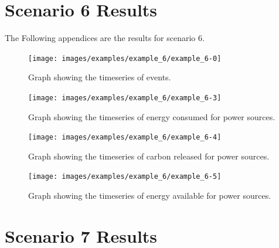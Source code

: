 \documentclass{l4proj}
\begin{document}
\begin{appendices}
\clearpage
\section{Scenario 6 Results}\label{apen:subsec:scen6}
The Following appendices are the results for scenario 6.
\clearpage
\begin{figure}[htbp]
    \centering
    \texttt{[image: images/examples/example\_6/example\_6-0]}
    ~
    \caption{Graph showing the timeseries of events.}
    \label{fig:example6-0}
\end{figure}
\clearpage
\begin{figure}[htbp]
    \centering
    \texttt{[image: images/examples/example\_6/example\_6-3]}
    ~
    \caption{Graph showing the timeseries of energy consumed for power sources.}
    \label{fig:example6-1}
\end{figure}
\clearpage
\begin{figure}[htbp]
    \centering
    \texttt{[image: images/examples/example\_6/example\_6-4]}
    ~
    \caption{Graph showing the timeseries of carbon released for power sources.}
    \label{fig:example6-2}
\end{figure}
\clearpage
\begin{figure}[htbp]
    \centering
    \texttt{[image: images/examples/example\_6/example\_6-5]}
    ~
    \caption{Graph showing the timeseries of energy available for power sources.}
    \label{fig:example6-3}
\end{figure}

\clearpage
\section{Scenario 7 Results}\label{apen:subsec:scen7}

\end{appendices}
\end{document}
